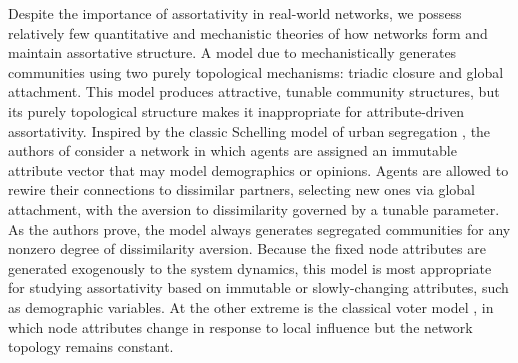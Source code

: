 \documentclass[review, onefignum, onetabnum]{siamart171218}
\begin{document}
	Despite the importance of assortativity in real-world networks, we possess relatively few quantitative and mechanistic theories of how networks form and maintain assortative structure. 
	A model due to \cite{Kumpula2007} mechanistically generates communities using two purely topological mechanisms: triadic closure and global attachment. 
	This model produces attractive, tunable community structures, but its purely topological structure makes it inappropriate for attribute-driven assortativity. 
	Inspired by the classic Schelling model of urban segregation \cite{Schelling1979}, the authors of \cite{Henry2011} consider a network in which agents are assigned an immutable attribute vector that may model demographics or opinions. 
	Agents are allowed to rewire their connections to dissimilar partners, selecting new ones via global attachment, with the aversion to dissimilarity governed by a tunable parameter. 
	As the authors prove, the model always generates segregated communities for any nonzero degree of dissimilarity aversion. 
	Because the fixed node attributes are generated exogenously to the system dynamics, this model is most appropriate for studying assortativity based on immutable or slowly-changing attributes, such as demographic variables. 
	At the other extreme is the classical voter model \cite{Clifford1973,Holley1975}, in which node attributes change in response to local influence but the network topology remains constant.
\end{document}
